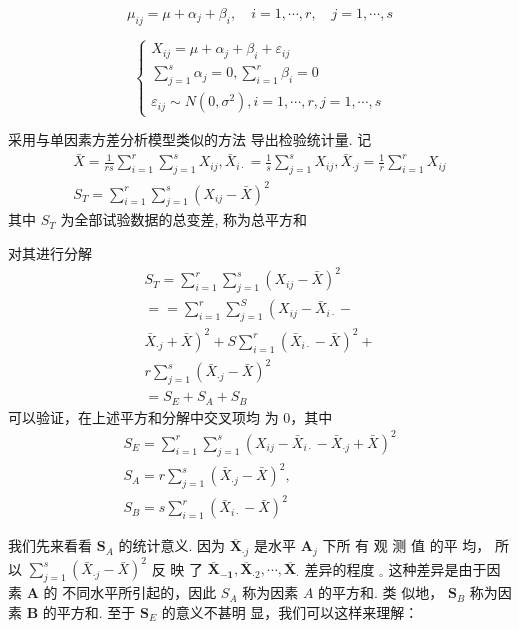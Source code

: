 $$
\mu_{i j}=\mu+\alpha_{j}+\beta_{i}, \quad i=1, \cdots, r, \quad j=1, \cdots, s
$$

$$ \left\{\begin{array}{l}X_{i j}=\mu+\alpha_{j}+\beta_{i}+\varepsilon_{i j} \\ \sum_{j=1}^{s} \alpha_{j}=0, \sum_{i=1}^{r} \beta_{i}=0 \\ \varepsilon_{i j} \sim N\left(0, \sigma^{2}\right), i=1, \cdots, r, j=1, \cdots, s\end{array}\right. $$

采用与单因素方差分析模型类似的方法 导出检验统计量. 
记
$$
\begin{array}{c}
\bar{X}=\frac{1}{r s} \sum_{i=1}^{r} \sum_{j=1}^{s} X_{i j}, \bar{X}_{i \cdot}=\frac{1}{s} \sum_{j=1}^{s} X_{i j}, \bar{X}_{\cdot j}=\frac{1}{r} \sum_{i=1}^{r} X_{i j} \\
S_{T}=\sum_{i=1}^{r} \sum_{j=1}^{s}\left(X_{i j}-\bar{X}\right)^{2}
\end{array}
$$
其中 \( S_{T} \) 为全部试验数据的总变差, 称为总平方和

对其进行分解
$$
\begin{array}{c}
S_{T}=\sum_{i=1}^{r} \sum_{j=1}^{s}\left(X_{i j}-\bar{X}\right)^{2} \\
==\sum_{i=1}^{r} \sum_{j=1}^{S}\left(X_{i j}-\bar{X}_{i \cdot}-\right. \\
\left.\bar{X}_{\cdot j}+\bar{X}\right)^{2}+S \sum_{i=1}^{r}\left(\bar{X}_{i \cdot}-\bar{X}\right)^{2}+ \\
r \sum_{j=1}^{s}\left(\bar{X}_{\cdot j}-\bar{X}\right)^{2} \\
=S_{E}+S_{A}+S_{B}
\end{array}
$$
可以验证，在上述平方和分解中交叉项均
为 0，其中
$$
\begin{array}{c}
S_{E}=\sum_{i=1}^{r} \sum_{j=1}^{s}\left(X_{i j}-\bar{X}_{i \cdot}-\bar{X}_{\cdot j}+\bar{X}\right)^{2} \\
S_{A}=r \sum_{j=1}^{s}\left(\bar{X}_{\cdot j}-\bar{X}\right)^{2}, \\
S_{B}= s \sum_{i=1}^{r}\left(\bar{X}_{i \cdot}-\bar{X}\right)^{2}
\end{array}
$$

我们先来看看 \( \boldsymbol{S}_{A} \) 的统计意义. 因为 \( \overline{\boldsymbol{X}}_{\mathbf{\cdot} j} \) 是水平 \( \boldsymbol{A}_{j} \) 下所
有 观 测 值 的平 均， 所 以 \( \sum_{j=1}^{s}\left(\bar{X}_{\cdot j}-\bar{X}\right)^{2} \) 反 映 了
\( \overline{\boldsymbol{X}}_{\mathbf{- 1}}, \overline{\boldsymbol{X}}_{\cdot 2}, \cdots, \overline{\boldsymbol{X}}_{\boldsymbol{\cdot}} \) 差异的程度 \( _{\circ} \) 这种差异是由于因素 \( \boldsymbol{A} \) 的
不同水平所引起的，因此 \( S_{A} \) 称为因素 \( A \) 的平方和. 类
似地， \( \boldsymbol{S}_{B} \) 称为因素 \( \boldsymbol{B} \) 的平方和. 至于 \( \boldsymbol{S}_{E} \) 的意义不甚明
显，我们可以这样来理解：


